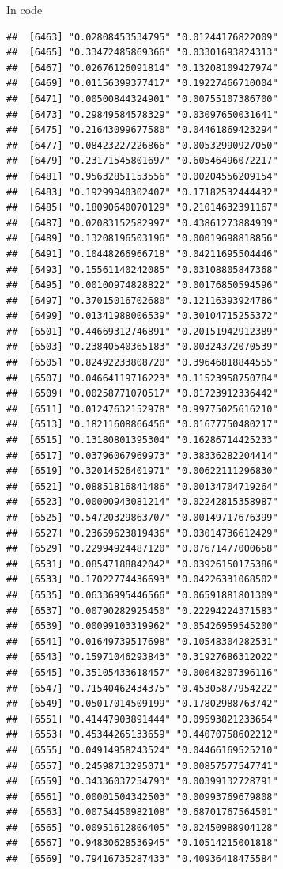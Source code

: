 \documentclass[ignorenonframetext,]{beamer}
\begin{document}
\begin{frame}[fragile]{In code}
\begin{verbatim}
##  [6463] "0.02808453534795" "0.01244176822009"
##  [6465] "0.33472485869366" "0.03301693824313"
##  [6467] "0.02676126091814" "0.13208109427974"
##  [6469] "0.01156399377417" "0.19227466710004"
##  [6471] "0.00500844324901" "0.00755107386700"
##  [6473] "0.29849584578329" "0.03097650031641"
##  [6475] "0.21643099677580" "0.04461869423294"
##  [6477] "0.08423227226866" "0.00532990927050"
##  [6479] "0.23171545801697" "0.60546496072217"
##  [6481] "0.95632851153556" "0.00204556209154"
##  [6483] "0.19299940302407" "0.17182532444432"
##  [6485] "0.18090640070129" "0.21014632391167"
##  [6487] "0.02083152582997" "0.43861273884939"
##  [6489] "0.13208196503196" "0.00019698818856"
##  [6491] "0.10448266966718" "0.04211695504446"
##  [6493] "0.15561140242085" "0.03108805847368"
##  [6495] "0.00100974828822" "0.00176850594596"
##  [6497] "0.37015016702680" "0.12116393924786"
##  [6499] "0.01341988006539" "0.30104715255372"
##  [6501] "0.44669312746891" "0.20151942912389"
##  [6503] "0.23840540365183" "0.00324372070539"
##  [6505] "0.82492233808720" "0.39646818844555"
##  [6507] "0.04664119716223" "0.11523958750784"
##  [6509] "0.00258771070517" "0.01723912336442"
##  [6511] "0.01247632152978" "0.99775025616210"
##  [6513] "0.18211608866456" "0.01677750480217"
##  [6515] "0.13180801395304" "0.16286714425233"
##  [6517] "0.03796067969973" "0.38336282204414"
##  [6519] "0.32014526401971" "0.00622111296830"
##  [6521] "0.08851816841486" "0.00134704719264"
##  [6523] "0.00000943081214" "0.02242815358987"
##  [6525] "0.54720329863707" "0.00149717676399"
##  [6527] "0.23659623819436" "0.03014736612429"
##  [6529] "0.22994924487120" "0.07671477000658"
##  [6531] "0.08547188842042" "0.03926150175386"
##  [6533] "0.17022774436693" "0.04226331068502"
##  [6535] "0.06336995446566" "0.06591881801309"
##  [6537] "0.00790282925450" "0.22294224371583"
##  [6539] "0.00099103319962" "0.05426959545200"
##  [6541] "0.01649739517698" "0.10548304282531"
##  [6543] "0.15971046293843" "0.31927686312022"
##  [6545] "0.35105433618457" "0.00048207396116"
##  [6547] "0.71540462434375" "0.45305877954222"
##  [6549] "0.05017014509199" "0.17802988763742"
##  [6551] "0.41447903891444" "0.09593821233654"
##  [6553] "0.45344265133659" "0.44070758602212"
##  [6555] "0.04914958243524" "0.04466169525210"
##  [6557] "0.24598713295071" "0.00857577547741"
##  [6559] "0.34336037254793" "0.00399132728791"
##  [6561] "0.00001504342503" "0.00993769679808"
##  [6563] "0.00754450982108" "0.68701767564501"
##  [6565] "0.00951612806405" "0.02450988904128"
##  [6567] "0.94830628536945" "0.10514215001818"
##  [6569] "0.79416735287433" "0.40936418475584"

\end{verbatim}
\end{frame}
\end{document}
